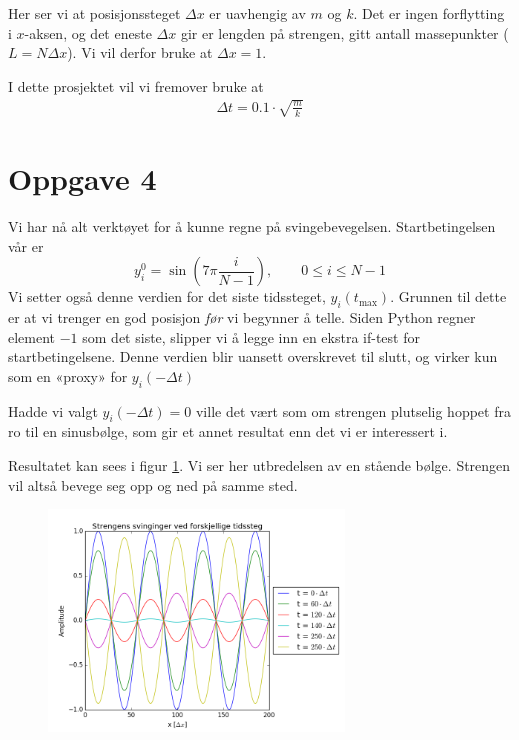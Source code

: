\documentclass[norsk,a4,12pt,fleqn]{extarticle}
\begin{document}
Her ser vi at posisjonssteget $\Delta x$ er uavhengig av
$m$ og $k$. Det er ingen forflytting i $x$-aksen, og det eneste
$\Delta x$ gir er lengden på strengen, gitt antall massepunkter ($L=N\Delta x$).
Vi vil derfor bruke at $\Delta x = 1$.

I dette prosjektet vil vi fremover bruke at
\begin{align}
    \Delta t = 0.1\cdot \sqrt{\frac{m}{k}}
\end{align}

\section*{Oppgave 4}
Vi har nå alt verktøyet for å kunne regne på svingebevegelsen.
Startbetingelsen vår er
\begin{equation}
y_i^0 = \sin\left(7\pi \frac{i}{N-1}\right), \qquad 0\leq i \leq N-1
\end{equation}
Vi setter også denne verdien for det siste tidssteget, $y_i(t_{\text{max}})$.
Grunnen til dette er at vi trenger en god posisjon \textit{før}
vi begynner å telle. Siden Python regner element $-1$ som
det siste, slipper vi å legge inn en ekstra if-test for
startbetingelsene.
Denne verdien blir uansett overskrevet til slutt, og virker
kun som en «proxy» for $y_i(-\Delta t)$

Hadde vi valgt $y_i(-\Delta t) = 0$ ville det vært som om strengen
plutselig hoppet fra ro til en sinusbølge, som gir et annet resultat
enn det vi er interessert i.

Resultatet kan sees i figur \ref{fig:prob4}.
Vi ser her utbredelsen av en stående bølge.
Strengen vil altså bevege seg opp og ned på samme sted.

\begin{figure}[H]
    \label{fig:prob4}
    \centering %
    \includegraphics[width=0.7\textwidth]{../src/problem4.png}
    \caption{} 
\end{figure} 
\end{document}
